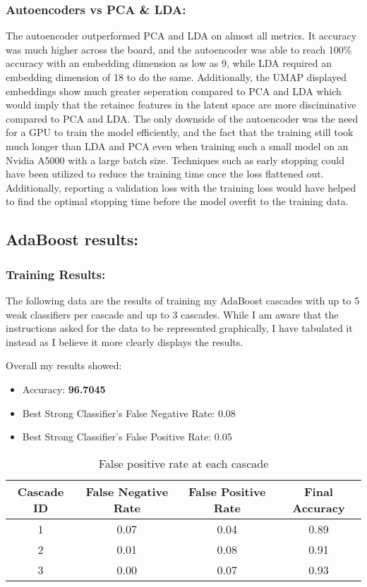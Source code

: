\documentclass{article}
\begin{document}
\subsubsection{Autoencoders vs PCA \& LDA:}
The autoencoder outperformed PCA and LDA on almost all metrics. It accuracy was much higher across the board, and the autoencoder was able to reach 100\% accuracy with an embedding dimension as low as 9, while LDA required an embedding dimension of 18 to do the same. Additionally, the UMAP displayed embeddings show much greater seperation compared to PCA and LDA which would imply that the retainec features in the latent space are more disciminative compared to PCA and LDA. The only downside of the autoencoder was the need for a GPU to train the model efficiently, and the fact that the training still took much longer than LDA and PCA even when training such a small model on an Nvidia A5000 with a large batch size. Techniques such as early stopping could have been utilized to reduce the training time once the loss flattened out. Additionally, reporting a validation loss with the training loss would have helped to find the optimal stopping time before the model overfit to the training data. 

\subsection{AdaBoost results:}
\subsubsection{Training Results: }
The following data are the results of training my AdaBoost cascades with up to 5 weak classifiers per cascade and up to 3 cascades. While I am aware that the instructions asked for the data to be represented graphically, I have tabulated it instead as I believe it more clearly displays the results.

Overall my results showed:
\begin{itemize}
    \item Accuracy: \textbf{96.7045}
    \item Best Strong Classifier's False Negative Rate: 0.08
    \item Best Strong Classifier's False Positive Rate: 0.05
\end{itemize}

\begin{table}[H]
    \centering
    \begin{tabular}{|c|c|c|c|}
        \hline
        \textbf{Cascade ID} & \textbf{False Negative Rate} & \textbf{False Positive Rate} & \textbf{Final Accuracy} \\ \hline
        1 & 0.07 & 0.04 & 0.89 \\ \hline
        2 & 0.01 & 0.08 & 0.91 \\ \hline
        3 & 0.00 & 0.07 & 0.93 \\ \hline
    \end{tabular}
    \caption{False positive rate at each cascade}
\end{table}
\end{document}
